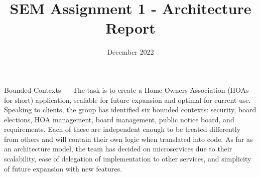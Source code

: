 \documentclass{article}
\title{SEM Assignment 1 - Architecture Report}
\date{December 2022}
\begin{document}
\maketitle
\begin{section}{Bounded Contexts}
$\quad$ The task is to create a Home Owners Association (HOAs for short) application, scalable for future expansion and optimal for current use. Speaking to clients, the group has identified six bounded contexts: security, board elections, HOA management, board management, public notice board, and requirements. Each of these are independent enough to be treated differently from others and will contain their own logic when translated into code. As far as an architecture model, the team has decided on microservices due to their scalability, ease of delegation of implementation to other services, and simplicity of future expansion with new features.
\end{section}{}
\end{document}
